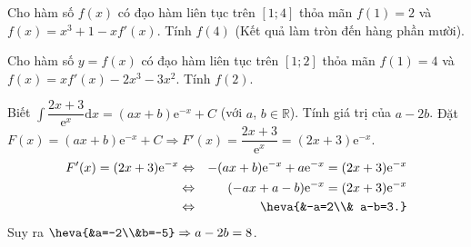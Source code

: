 \begin{ex}%
Cho hàm số $f(x)$ có đạo hàm liên tục trên $[1;4]$ thỏa mãn $f(1)=2$ và $f(x)=x^3+1-xf'(x)$. Tính $f(4)$ (Kết quả làm tròn đến hàng phần mười).
\end{ex}

\begin{ex}%
Cho hàm số $y=f(x)$ có đạo hàm liên tục trên $[1;2]$ thỏa mãn $f(1)=4$ và $f(x)=xf'(x)-2x^3-3x^2$. Tính $f(2)$.
\end{ex}

\begin{ex}%
Biết $\displaystyle\int   \dfrac{2x+3}{\mathrm{e}^x}\text{d}x= (ax+b)\mathrm{e}^{-x}+C$ (với $a$, $b\in \mathbb{R}$). Tính giá trị của $a-2b$.
\loigiai
{
Đặt $F(x)=(ax+b)\mathrm{e}^{-x}+C\Rightarrow F'(x)=\dfrac{2x+3}{\mathrm{e}^x}=(2x+3)\mathrm{e}^{-x}$.
\begin{eqnarray*}
F'(x)=(2x+3)\mathrm{e}^{-x} &\Leftrightarrow& -(ax+b)\mathrm{e}^{-x}+a  \mathrm{e}^{-x}=(2x+3)\mathrm{e}^{-x} \\
&\Leftrightarrow&(-ax+a-b)\mathrm{e}^{-x}=(2x+3)\mathrm{e}^{-x}\\
&\Leftrightarrow &\heva{&-a=2\\& a-b=3.}
\end{eqnarray*}
Suy ra $\heva{&a=-2\\&b=-5}\Rightarrow a-2b =8$.
}
\end{ex}

